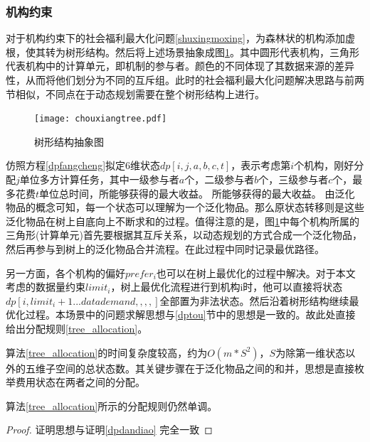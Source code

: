 \documentclass[promaster]{thesis-uestc}
\begin{document}

\FloatBarrier

\subsubsection{机构约束}
对于机构约束下的社会福利最大化问题\ref{shuxingmoxing}，为森林状的机构添加虚根，使其转为树形结构。然后将上述场景抽象成图\ref{chouxiangtree}。其中圆形代表机构，三角形代表机构中的计算单元，即机制的参与者。颜色的不同体现了其数据来源的差异性，从而将他们划分为不同的互斥组。此时的社会福利最大化问题解决思路与前两节相似，不同点在于动态规划需要在整个树形结构上进行。

\begin{figure}[h]
    \texttt{[image: chouxiangtree.pdf]}
    \caption{树形结构抽象图}
    \label{chouxiangtree}
\end{figure}

仿照方程\ref{dpfangcheng}拟定6维状态$dp[i,j,a,b,c,t]$，表示考虑第$i$个机构，刚好分配$j$单位多方计算任务，其中一级参与者$a$个，二级参与者$b$个，三级参与者$c$个，最多花费$t$单位总时间，所能够获得的最大收益。
所能够获得的最大收益。
由泛化物品的概念可知，每一个状态可以理解为一个泛化物品。那么原状态转移则是这些泛化物品在树上自底向上不断求和的过程。值得注意的是，图\ref{chouxiangtree}中每个机构所属的三角形(计算单元)首先要根据其互斥关系，以动态规划的方式合成一个泛化物品，然后再参与到树上的泛化物品合并流程。在此过程中同时记录最优路径。

另一方面，各个机构的偏好$prefer_i$也可以在树上最优化的过程中解决。对于本文考虑的数据量约束$limit_i$，树上最优化流程进行到机构i时，他可以直接将状态$dp[i,limit_i+1...datademand,,,,]$全部置为非法状态。然后沿着树形结构继续最优化过程。本场景中的问题求解思想与\ref{dptou}节中的思想是一致的。故此处直接给出分配规则\ref{tree_allocation}。


算法\ref{tree_allocation}的时间复杂度较高，约为$O(m*S^2)$，$S$为除第一维状态以外的五维子空间的总状态数。其关键步骤在于泛化物品之间的和并，思想是直接枚举费用状态在两者之间的分配。

\begin{theorem}
 算法\ref{tree_allocation}所示的分配规则仍然单调。 
\end{theorem}

\begin{proof}
证明思想与证明\ref{dpdandiao} 完全一致
\end{proof}
\end{document}
